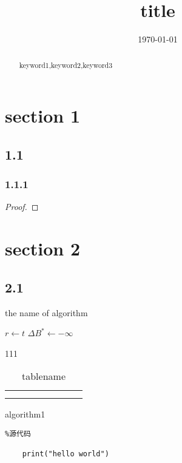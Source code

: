 \documentclass{mcmthesis}
\begin{document}
\linespread{0.6} %
\setlength{\parskip}{0.5\baselineskip} %
\title{title}

\date{\today}
	\begin{abstract}
		\begin{keywords}
		keyword1,keyword2,keyword3
		\end{keywords}
		
	\end{abstract}
\maketitle


\tableofcontents
\newpage
\section{section 1}
	\subsection{1.1}
		\subsubsection{1.1.1}
		
			\begin{shaded}
				\begin{proof}
					
			
				\end{proof}
			\end{shaded}

\section{section 2}
	\subsection{2.1}
	\begin{algorithm}%
		\caption{the name of algorithm}\label{an_algorithm}
		$r\leftarrow t$\;
		$\Delta B^{\ast}\leftarrow -\infty$\;
	\end{algorithm}
	111
	\cite{WWFReport}
	\begin{table}[h]%
		\centering
		\caption{tablename}\label{table}
		\begin{tabular}{cccccccc}
			\toprule
			\\
			\midrule
			\\
			\\
			\bottomrule
		\end{tabular}
	\end{table}




\newpage
\begin{appendices}

algorithm1
\begin{lstlisting}%源代码	

	print("hello world") 
\end{lstlisting}


\end{appendices}
\end{document}
